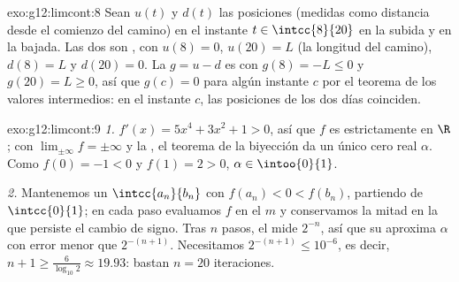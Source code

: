 \begin{solution}{exo:g12:limcont:8}
Sean $u(t)$ y $d(t)$ las posiciones (medidas como distancia desde el
comienzo del camino) en el instante $t \in \intcc{8}{20}$ en la subida y
en la bajada. Las dos son , con $u(8) = 0$, $u(20) = L$ (la
longitud del camino), $d(8) = L$ y $d(20) = 0$. La  $g = u - d$ es
 con $g(8) = -L \leq 0$ y $g(20) = L \geq 0$, así que $g(c) = 0$
para algún instante $c$ por el teorema de los valores intermedios: en el
instante $c$, las posiciones de los dos días coinciden.
\end{solution}

\begin{solution}{exo:g12:limcont:9}
\emph{1.} $f'(x) = 5x^4 + 3x^2 + 1 > 0$, así que $f$ es estrictamente
 en $\R$; con $\lim_{\pm\infty} f = \pm\infty$ y la ,
el teorema de la biyección da un único cero real $\alpha$. Como
$f(0) = -1 < 0$ y $f(1) = 2 > 0$, $\alpha \in \intoo{0}{1}$.

\emph{2.} Mantenemos un  $\intcc{a_n}{b_n}$ con
$f(a_n) < 0 < f(b_n)$, partiendo de $\intcc{0}{1}$; en cada paso evaluamos
$f$ en el  $m$ y conservamos la mitad en la que persiste el
cambio de signo. Tras $n$ pasos, el  mide $2^{-n}$, así que su
 aproxima $\alpha$ con error menor que $2^{-(n+1)}$.
Necesitamos $2^{-(n+1)} \leq 10^{-6}$, es decir,
$n + 1 \geq \frac{6}{\log_{10} 2} \approx 19.93$: bastan $n = 20$
iteraciones.
\end{solution}

